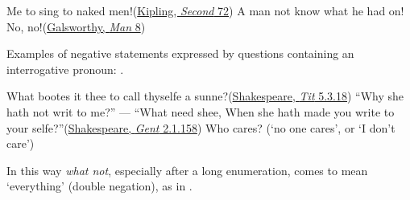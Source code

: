 \ex
Me to sing to naked men!\hfill(\href{https://archive.org/details/sim_new-mcclures-magazine_1895-01_4_2/page/132/mode/2up?q=\%22Me+to+sing+to+naked+men\%22&view=theater}{Kipling, \textit{Second} 72}) %
\ex
A man not know what he had on! No, no!\hfill(\href{https://archive.org/details/manofproperty00gals/page/8/mode/2up?q=\%22A+man+not+know+what+he+had+on\%22&view=theater}{Galsworthy, \textit{Man} 8})
\z
\z {}

Examples of negative statements expressed by questions containing an interrogative pronoun: .

\ea \label{ex:04-26}
\ea
What bootes it thee to call thyselfe a sunne?\hfill(\href{https://internetshakespeare.uvic.ca/doc/Tit_F1/scene/5.3/index.html#tln-2515}{Shakespeare, \textit{Tit} 5.3.18}) %
\ex
``Why she hath not writ to me?'' --- ``What need shee, When she hath made you write to your selfe?''\hfill(\href{https://internetshakespeare.uvic.ca/doc/TGV_F1/scene/2.1/index.html#tln-540}{Shakespeare, \textit{Gent} 2.1.158}) %
\ex
Who cares? \phantom{x} (`no one cares', or `I don't care')
\z
\z

In this way \textit{what not}, especially after a long enumeration, comes to mean `everything' (double negation), as in .

